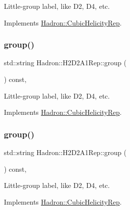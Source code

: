 Little-\/group label, like D2, D4, etc. 

Implements \mbox{\hyperlink{structHadron_1_1CubicHelicityRep_a101a7d76cd8ccdad0f272db44b766113}{Hadron\+::\+Cubic\+Helicity\+Rep}}.

\mbox{\label{structHadron_1_1H2D2A1Rep_a8e1e801312be98b0f43fff8d5d61f0a4}} 
\subsubsection{\texorpdfstring{group()}{group()}\hspace{0.1cm}{\footnotesize\ttfamily [3/5]}}
{\footnotesize\ttfamily std\+::string Hadron\+::\+H2\+D2\+A1\+Rep\+::group (\begin{DoxyParamCaption}{ }\end{DoxyParamCaption}) const\hspace{0.3cm}{\ttfamily [inline]}, {\ttfamily [virtual]}}

Little-\/group label, like D2, D4, etc. 

Implements \mbox{\hyperlink{structHadron_1_1CubicHelicityRep_a101a7d76cd8ccdad0f272db44b766113}{Hadron\+::\+Cubic\+Helicity\+Rep}}.

\mbox{\label{structHadron_1_1H2D2A1Rep_a8e1e801312be98b0f43fff8d5d61f0a4}} 
\subsubsection{\texorpdfstring{group()}{group()}\hspace{0.1cm}{\footnotesize\ttfamily [4/5]}}
{\footnotesize\ttfamily std\+::string Hadron\+::\+H2\+D2\+A1\+Rep\+::group (\begin{DoxyParamCaption}{ }\end{DoxyParamCaption}) const\hspace{0.3cm}{\ttfamily [inline]}, {\ttfamily [virtual]}}

Little-\/group label, like D2, D4, etc. 

Implements \mbox{\hyperlink{structHadron_1_1CubicHelicityRep_a101a7d76cd8ccdad0f272db44b766113}{Hadron\+::\+Cubic\+Helicity\+Rep}}.

\mbox{\label{structHadron_1_1H2D2A1Rep_a8e1e801312be98b0f43fff8d5d61f0a4}} 
